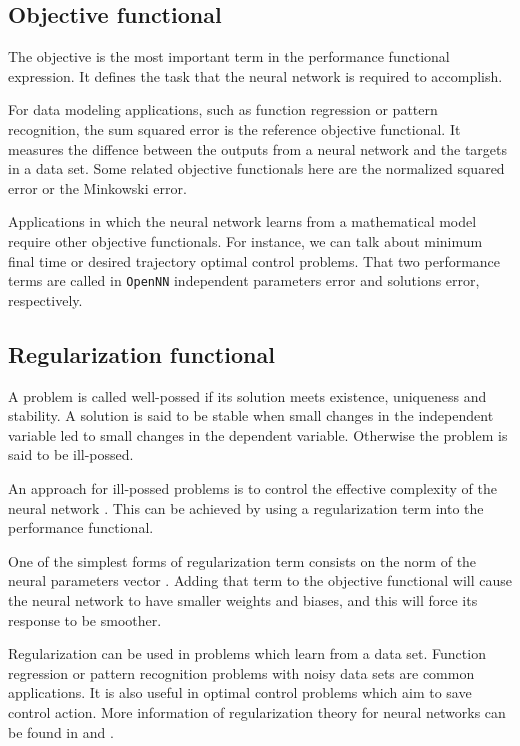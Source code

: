 
\subsection*{Objective functional}

The objective is the most important term in the performance functional expression. It defines the task that the neural
network is required to accomplish.

For data modeling applications, such as function regression or pattern recognition, the sum squared error is the reference objective functional. It measures the diffence between the outputs from a neural network and the targets in a data set.  
Some related objective functionals here are the normalized squared error or the Minkowski error. 

Applications in which the neural network learns from a mathematical model require other objective functionals. 
For instance, we can talk about minimum final time or desired trajectory optimal control problems. 
That two performance terms are called in \texttt{OpenNN} independent parameters error and solutions error, respectively.

\subsection*{Regularization functional}

A problem is called well-possed if its solution meets
existence, uniqueness and stability. A solution is said to be stable when
small changes in the independent variable led to
small changes in the dependent variable.
Otherwise the problem is said to be ill-possed. 

An approach for ill-possed problems is to control the effective complexity of the neural network
\cite{Tikhonov1977}. This can be achieved by using a regularization term into the performance functional.  

One of the simplest forms of regularization term consists on the norm of the neural parameters vector \cite{Bishop1995}. 
Adding that term to the objective functional will cause the neural network to have
smaller weights and biases, and this will force its response to be
smoother.

Regularization can be used in problems which learn from a data set. 
Function regression or pattern recognition problems with noisy data sets are common applications.  
It is also useful in optimal control problems which aim to save control action. 
More information of regularization theory for neural networks can be found in \cite{Girosi1995} and \cite{Chen2002}.

